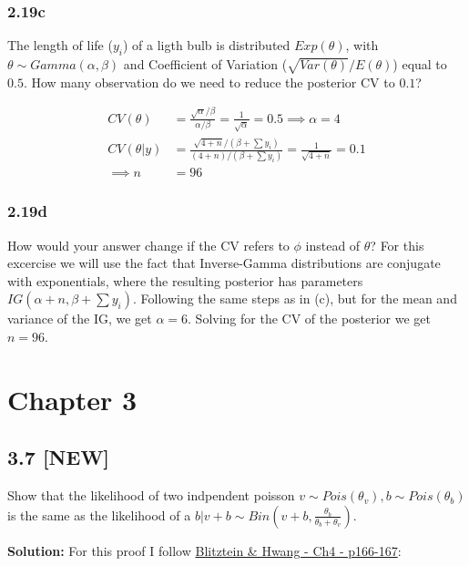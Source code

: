 \documentclass[]{article}
\begin{document}
\subsubsection{2.19c}\label{c-1}

The length of life (\(y_{i}\)) of a ligth bulb is distributed
\(Exp(\theta)\), with \(\theta \sim Gamma(\alpha, \beta)\) and
Coefficient of Variation (\(\sqrt{Var(\theta)} / E(\theta)\)) equal to
\(0.5\). How many observation do we need to reduce the posterior CV to
\(0.1\)?

\[
\begin{aligned}
CV(\theta) &= \frac{\sqrt{\alpha}/\beta}{\alpha/\beta} = \frac{1}{\sqrt{\alpha}} = 0.5 \implies  \alpha = 4 \\
CV(\theta|y) &= \frac{\sqrt{4 + n}/( \beta + \sum y_{i} ) } { (4+n)/(\beta + \sum y_{i})} =  \frac{1}{\sqrt{4 + n}} = 0.1\\
\implies n &= 96
\end{aligned}
\]

\subsubsection{2.19d}\label{d}

How would your answer change if the CV refers to \(\phi\) instead of
\(\theta\)? For this excercise we will use the fact that Inverse-Gamma
distributions are conjugate with exponentials, where the resulting
posterior has parameters \(IG(\alpha +n, \beta + \sum y_{i})\).
Following the same steps as in (c), but for the mean and variance of the
IG, we get \(\alpha = 6\). Solving for the CV of the posterior we get
\(n = 96\).

\section{Chapter 3}\label{chapter-3}

\subsection{\texorpdfstring{3.7
\textbf{{[}NEW{]}}}{3.7 {[}NEW{]}}}\label{new-2}

Show that the likelihood of two indpendent poisson
\(v \sim Pois(\theta_{v}), b \sim Pois(\theta_{b})\) is the same as the
likelihood of a
\(b|v+b \sim Bin(v+b, \frac{\theta_{b}}{\theta_{b} + \theta_{v}})\).

\textbf{Solution:} For this proof I follow
\href{http://www.amazon.com/gp/product/1466575573/ref=pd_lpo_sbs_dp_ss_2?pf_rd_p=1944687522\&pf_rd_s=lpo-top-stripe-1\&pf_rd_t=201\&pf_rd_i=188652940X\&pf_rd_m=ATVPDKIKX0DER\&pf_rd_r=0Y2GG9RTCM87QYXDVJQJ}{Blitztein
\& Hwang - Ch4 - p166-167}:
\end{document}
